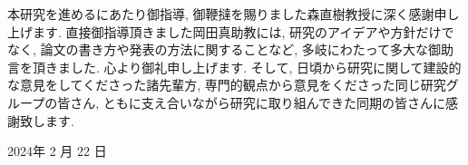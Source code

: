 \newpage
\changeindent{0cm}
\acknowledgements
\changeindent{2cm}

本研究を進めるにあたり御指導, 御鞭撻を賜りました森直樹教授に深く感謝申し上げます. 直接御指導頂きました岡田真助教には, 研究のアイデアや方針だけでなく, 論文の書き方や発表の方法に関することなど, 多岐にわたって多大な御助言を頂きました. 心より御礼申し上げます. そして, 日頃から研究に関して建設的な意見をしてくださった諸先輩方, 専門的観点から意見をくださった同じ研究グループの皆さん, ともに支え合いながら研究に取り組んできた同期の皆さんに感謝致します.

\begin{flushright}
  2024年 2 月 22 日
\end{flushright}